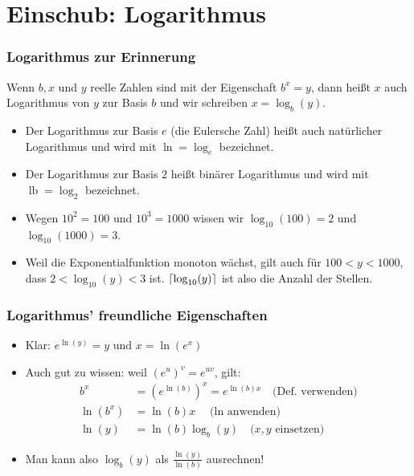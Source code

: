 \section{Einschub: Logarithmus}

\begin{frame}
  \frametitle{Logarithmus zur Erinnerung}
  \begin{definition}[Logarithmus]
    Wenn $b, x$ und $y$ reelle Zahlen sind mit der Eigenschaft $b^x = y$, dann heißt $x$ auch \alert{Logarithmus von $y$ zur Basis $b$} und wir schreiben $x = \log_b(y)$.
  \end{definition}
  \begin{itemize}[<+->]
    \item Der Logarithmus zur Basis $e$ (die Eulersche Zahl) heißt auch \alert{natürlicher Logarithmus} und wird mit $\ln = \log_e$ bezeichnet.
    \item Der Logarithmus zur Basis $2$ heißt \alert{binärer Logarithmus} und wird mit $\operatorname{lb} = \log_2$ bezeichnet.
    \item Wegen $10^2 = 100$ und $10^3 = 1000$ wissen wir $\log_{10}(100) = 2$ und $\log_{10}(1000) = 3$.
    \item Weil die Exponentialfunktion monoton wächst, gilt auch für $100 < y < 1000$, dass $2 < \log_{10}(y) < 3$ ist. $\left\lceil \log_{10}(y) \right\rceil$ ist also die Anzahl der Stellen.
  \end{itemize}
\end{frame}

\begin{frame}
  \frametitle{Logarithmus' freundliche Eigenschaften}
  \begin{itemize}[<+->]
    \item Klar: $e^{\ln(y)} = y$ und $x = \ln(e^x)$
    \item Auch gut zu wissen: weil $(e^u)^v = e^{uv}$, gilt:
      \begin{align*}
        b^x &= (e^{\ln(b)})^x = e^{\ln(b)x} \quad \text{(Def. verwenden)} \\
        \ln(b^x) &= \ln(b)x \quad \text{($\ln$ anwenden)} \\
        \ln(y) &= \ln(b)\log_b(y) \quad \text{($x, y$ einsetzen)}
      \end{align*}
    \item Man kann also $\log_b(y)$ als $\frac{\ln(y)}{\ln(b)}$ ausrechnen!
  \end{itemize}
\end{frame}


